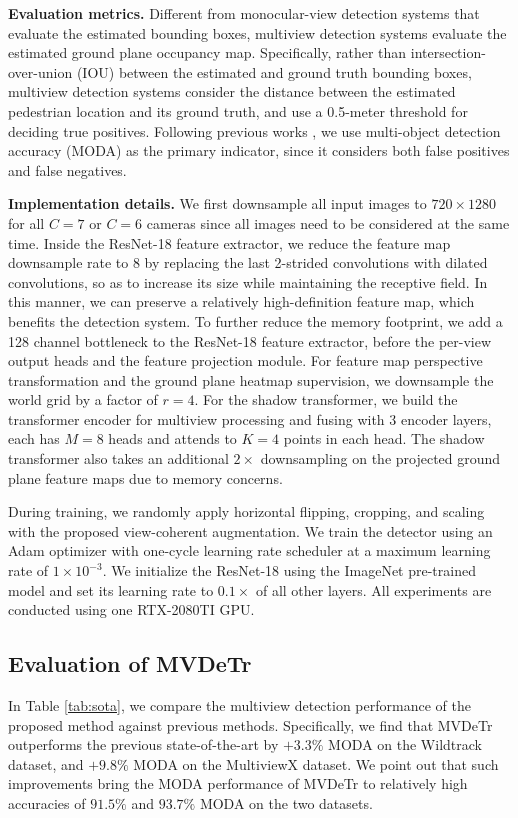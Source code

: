 \documentclass[sigconf,authorversion,nonacm]{acmart}
\begin{document}
\textbf{Evaluation metrics.}
Different from monocular-view detection systems that evaluate the estimated bounding boxes, multiview detection systems evaluate the estimated ground plane occupancy map. Specifically, rather than intersection-over-union (IOU) between the estimated and ground truth bounding boxes, multiview detection systems consider the distance between the estimated pedestrian location and its ground truth, and use a 0.5-meter threshold for deciding true positives. 
Following previous works \cite{chavdarova2018wildtrack,hou2020multiview}, we use multi-object detection accuracy (MODA) as the primary indicator, since it considers both false positives and false negatives. 


\textbf{Implementation details.}
We first downsample all input images to $720 \times 1280$ for all $C=7$ or $C=6$ cameras since all images need to be considered at the same time. 
Inside the ResNet-18 feature extractor, we reduce the feature map downsample rate to 8 by replacing the last 2-strided convolutions with dilated convolutions, so as to increase its size while maintaining the receptive field. In this manner, we can preserve a relatively high-definition feature map, which benefits the detection system. To further reduce the memory footprint, we add a 128 channel bottleneck to the ResNet-18 feature extractor, before the per-view output heads and the feature projection module. 
For feature map perspective transformation and the ground plane heatmap supervision, we downsample the world grid by a factor of $r=4$. 
For the shadow transformer, we build the transformer encoder for multiview processing and fusing with 3 encoder layers, each has $M=8$ heads and attends to $K=4$ points in each head. The shadow transformer also takes an additional $2\times$ downsampling on the projected ground plane feature maps due to memory concerns. 

During training, we randomly apply horizontal flipping, cropping, and scaling with the proposed view-coherent augmentation. We train the detector using an Adam optimizer \cite{kingma2015adam} with one-cycle learning rate scheduler \cite{smith2019super} at a maximum learning rate of $1\times10^{-3}$. We initialize the ResNet-18 using the ImageNet \cite{imagenet_cvpr09} pre-trained model and set its learning rate to $0.1\times$ of all other layers. 
All experiments are conducted using one RTX-2080TI GPU. 



\subsection{Evaluation of MVDeTr}
In Table \ref{tab:sota}, we compare the multiview detection performance of the proposed method against previous methods. Specifically, we find that MVDeTr outperforms the previous state-of-the-art by $+3.3\%$ MODA on the Wildtrack dataset, and $+9.8\%$ MODA on the MultiviewX dataset. We point out that such improvements bring the MODA performance of MVDeTr to relatively high accuracies of  $91.5\%$ and $93.7\%$ MODA on the two datasets. 
\end{document}
